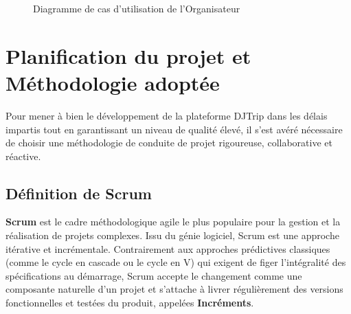 \documentclass[12pt,a4paper]{report}
\begin{document}
\begin{figure}[htbp]
\centering
{}
\caption{Diagramme de cas d'utilisation de l'Organisateur}
\label{fig:uc_organisateur}
\end{figure}

\newpage

\section{Planification du projet et Méthodologie adoptée}
Pour mener à bien le développement de la plateforme DJTrip dans les délais impartis tout en garantissant un niveau de qualité élevé, il s'est avéré nécessaire de choisir une méthodologie de conduite de projet rigoureuse, collaborative et réactive.

\subsection{Définition de Scrum}
\textbf{Scrum} est le cadre méthodologique agile le plus populaire pour la gestion et la réalisation de projets complexes. Issu du génie logiciel, Scrum est une approche itérative et incrémentale. Contrairement aux approches prédictives classiques (comme le cycle en cascade ou le cycle en V) qui exigent de figer l'intégralité des spécifications au démarrage, Scrum accepte le changement comme une composante naturelle d'un projet et s'attache à livrer régulièrement des versions fonctionnelles et testées du produit, appelées \textbf{Incréments}.
\end{document}
